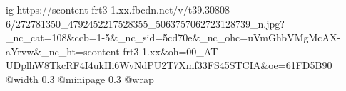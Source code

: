 
 
 
 
 

\ifcmt
  ig https://scontent-frt3-1.xx.fbcdn.net/v/t39.30808-6/272781350_4792452217528355_5063757062723128739_n.jpg?_nc_cat=108&ccb=1-5&_nc_sid=5cd70e&_nc_ohc=uVmGhbVMgMcAX-aYrvw&_nc_ht=scontent-frt3-1.xx&oh=00_AT-UDplhW8TkcRF4I4ukHi6WvNdPU2T7Xmf33FS45STCIA&oe=61FD5B90
  @width 0.3
  @minipage 0.3
  @wrap \parpic[r]
\fi
